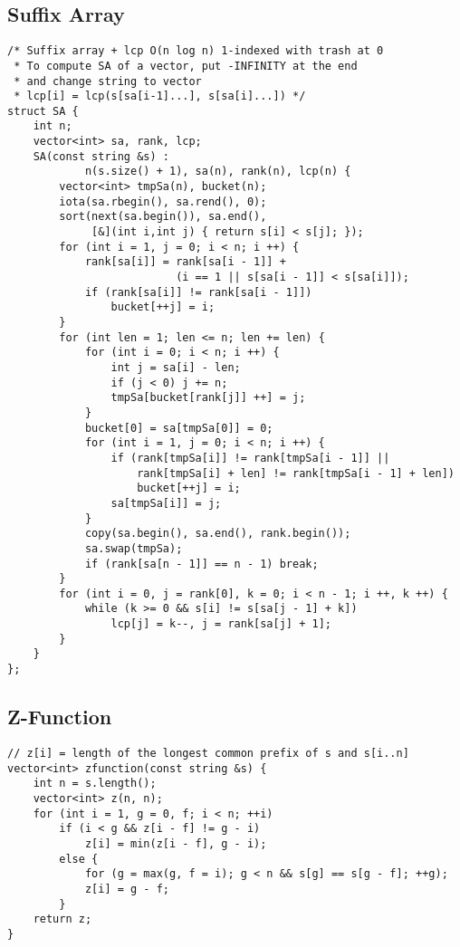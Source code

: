 \documentclass[landscape, 8pt, a4paper, oneside]{extarticle}
\begin{document}
\begin{multicols}{3}
\subsection{Suffix Array}
\begin{verbatim}
/* Suffix array + lcp O(n log n) 1-indexed with trash at 0
 * To compute SA of a vector, put -INFINITY at the end
 * and change string to vector
 * lcp[i] = lcp(s[sa[i-1]...], s[sa[i]...]) */
struct SA {
    int n;
    vector<int> sa, rank, lcp;
    SA(const string &s) :
            n(s.size() + 1), sa(n), rank(n), lcp(n) {
        vector<int> tmpSa(n), bucket(n);
        iota(sa.rbegin(), sa.rend(), 0);
        sort(next(sa.begin()), sa.end(),
             [&](int i,int j) { return s[i] < s[j]; });
        for (int i = 1, j = 0; i < n; i ++) {
            rank[sa[i]] = rank[sa[i - 1]] +
                          (i == 1 || s[sa[i - 1]] < s[sa[i]]);
            if (rank[sa[i]] != rank[sa[i - 1]])
                bucket[++j] = i;
        }
        for (int len = 1; len <= n; len += len) {
            for (int i = 0; i < n; i ++) {
                int j = sa[i] - len;
                if (j < 0) j += n;
                tmpSa[bucket[rank[j]] ++] = j;
            }
            bucket[0] = sa[tmpSa[0]] = 0;
            for (int i = 1, j = 0; i < n; i ++) {
                if (rank[tmpSa[i]] != rank[tmpSa[i - 1]] ||
                    rank[tmpSa[i] + len] != rank[tmpSa[i - 1] + len])
                    bucket[++j] = i;
                sa[tmpSa[i]] = j;
            }
            copy(sa.begin(), sa.end(), rank.begin());
            sa.swap(tmpSa);
            if (rank[sa[n - 1]] == n - 1) break;
        }
        for (int i = 0, j = rank[0], k = 0; i < n - 1; i ++, k ++) {
            while (k >= 0 && s[i] != s[sa[j - 1] + k])
                lcp[j] = k--, j = rank[sa[j] + 1];
        }
    }
};
\end{verbatim}
\subsection{Z-Function}
\begin{verbatim}
// z[i] = length of the longest common prefix of s and s[i..n]
vector<int> zfunction(const string &s) {
    int n = s.length();
    vector<int> z(n, n);
    for (int i = 1, g = 0, f; i < n; ++i)
        if (i < g && z[i - f] != g - i)
            z[i] = min(z[i - f], g - i);
        else {
            for (g = max(g, f = i); g < n && s[g] == s[g - f]; ++g);
            z[i] = g - f;
        }
    return z;
}
\end{verbatim}

\end{multicols}
\end{document}
